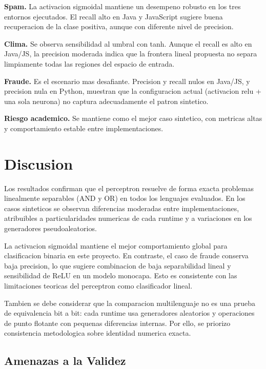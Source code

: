 \documentclass[10pt,twocolumn,a4paper]{article}
\begin{document}
\textbf{Spam.} La activacion sigmoidal mantiene un desempeno robusto
en los tres entornos ejecutados. El recall alto en Java y JavaScript
sugiere buena recuperacion de la clase positiva, aunque con diferente
nivel de precision.

\textbf{Clima.} Se observa sensibilidad al umbral con tanh. Aunque el
recall es alto en Java/JS, la precision moderada indica que la
frontera lineal propuesta no separa limpiamente todas las regiones del
espacio de entrada.

\textbf{Fraude.} Es el escenario mas desafiante. Precision y recall
nulos en Java/JS, y precision nula en Python, muestran que la
configuracion actual (activacion relu + una sola neurona) no captura
adecuadamente el patron sintetico.

\textbf{Riesgo academico.} Se mantiene como el mejor caso sintetico,
con metricas altas y comportamiento estable entre implementaciones.

\section{Discusion}

\lettrine[lines=2]{L}{}os resultados confirman que el perceptron
resuelve de forma exacta problemas linealmente separables (AND y OR)
en todos los lenguajes evaluados. En los casos sinteticos se observan
diferencias moderadas entre implementaciones, atribuibles a
particularidades numericas de cada runtime y a variaciones en los
generadores pseudoaleatorios.

La activacion sigmoidal mantiene el mejor comportamiento global para
clasificacion binaria en este proyecto. En contraste, el caso de
fraude conserva baja precision, lo que sugiere combinacion de baja
separabilidad lineal y sensibilidad de ReLU en un modelo monocapa.
Esto es consistente con las limitaciones teoricas del perceptron como
clasificador lineal.

Tambien se debe considerar que la comparacion multilenguaje no es una
prueba de equivalencia bit a bit: cada runtime usa generadores
aleatorios y operaciones de punto flotante con pequenas diferencias
internas. Por ello, se priorizo consistencia metodologica sobre
identidad numerica exacta.

\subsection{Amenazas a la Validez}
\end{document}
